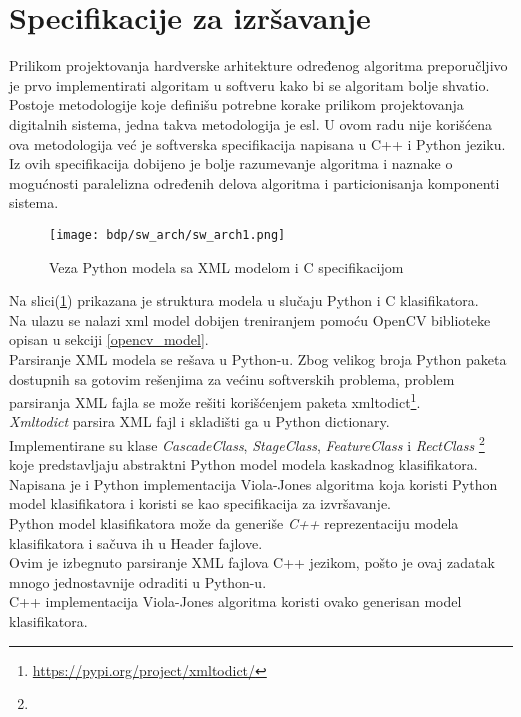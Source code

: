 \section{Specifikacije za izršavanje}

Prilikom projektovanja hardverske arhitekture određenog algoritma preporučljivo
je prvo implementirati algoritam u softveru kako bi se algoritam bolje shvatio. \\
Postoje metodologije koje definišu potrebne korake prilikom projektovanja
digitalnih sistema, jedna takva metodologija je \gls{esl}.
U ovom radu nije korišćena ova metodologija već je softverska
specifikacija napisana u C++ i Python jeziku. \\
Iz ovih specifikacija dobijeno je bolje razumevanje algoritma i naznake o
mogućnosti paralelizna određenih delova algoritma i particionisanja komponenti
sistema. \\

\begin{figure}[H]
  \centering
  \texttt{[image: bdp/sw\_arch/sw\_arch1.png]}
  \caption{Veza Python modela sa XML modelom i C specifikacijom}
  \label{sw_arch_spec1}
\end{figure}

Na slici(\ref{sw_arch_spec1}) prikazana je struktura modela u slučaju Python i C
klasifikatora. \\

\noindent
Na ulazu se nalazi \gls{xml} model dobijen treniranjem pomoću OpenCV biblioteke opisan u sekciji
\ref{opencv_model}. \\
Parsiranje XML modela se rešava u Python-u.
Zbog velikog broja Python paketa dostupnih sa gotovim rešenjima za većinu softverskih problema, problem
parsiranja XML fajla se može rešiti korišćenjem paketa xmltodict\footnote{\url{https://pypi.org/project/xmltodict/}}. \\
\emph{Xmltodict} parsira XML fajl i skladišti ga u Python dictionary. \\
Implementirane su klase \emph{CascadeClass}, \emph{StageClass}, \emph{FeatureClass} i
\emph{RectClass}
\footnote{\texttt{}} koje
predstavljaju abstraktni Python model modela kaskadnog klasifikatora. \\

Napisana je i Python implementacija Viola-Jones algoritma koja koristi Python
model klasifikatora i koristi se kao specifikacija za izvršavanje. \\

Python model klasifikatora može da generiše \emph{C++} reprezentaciju modela
klasifikatora i sačuva ih u Header fajlove. \\
Ovim je izbegnuto parsiranje XML fajlova C++ jezikom, pošto je ovaj zadatak
mnogo jednostavnije odraditi u Python-u. \\
C++ implementacija Viola-Jones algoritma koristi ovako generisan model
klasifikatora.